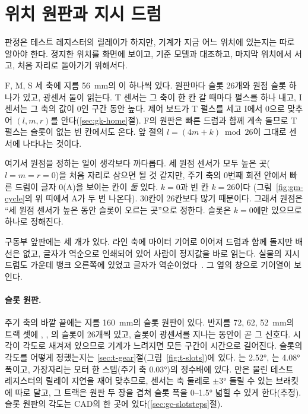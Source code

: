 \section{위치 원판과 지시 드럼}\label{sec:gm-posdisc}

판정은 테스트 레지스터의 릴레이가 하지만, 기계가 지금 어느 위치에 있는지는 따로 알아야 한다. 정지한 위치를 화면에
보이고, 기준 모델과 대조하고, 마지막 위치에서 서고, 처음 자리로 돌아가기 위해서다.

\Ours F, M, S 세 축에 지름 56~mm의 이 하나씩 있다. 원판마다 슬롯 26개와 원점 슬롯
하나가 있고, 광센서 둘이 읽는다. T 센서는 그 축이 한 칸 갈 때마다 펄스를 하나 내고, I 센서는 그 축의 값이 0인 구간
동안 높다. 제어 보드가 T 펄스를 세고 I에서 0으로 맞추어 $(l, m, r)$를 안다(\ref{sec:gk-home}절). F의 원판은 빠른
드럼과 함께 계속 돌므로 T 펄스는 슬롯이 없는 빈 칸에서도 온다. 앞 절의 $l = (4m+k) \bmod 26$이 그대로 센서에 나타나는
것이다.

여기서 원점을 정하는 일이 생각보다 까다롭다. 세 원점 센서가 모두 높은 곳($l = m = r = 0$)을 처음 자리로 삼으면 될 것
같지만, 주기 축의 0번째 회전 안에서 빠른 드럼이 글자 0(A)을 보이는 칸이 \emph{둘} 있다. $k = 0$과 빈 칸 $k = 26$이다
(그림~\ref{fig:gm-cycle}의 위 띠에서 A가 두 번 나온다). 30칸이 26칸보다 많기 때문이다. 그래서 원점은 ``세 원점 센서가
높은 동안  슬롯이 오르는 곳''으로 정한다. 슬롯은 $k = 0$에만 있으므로 하나로 정해진다.

구동부 앞판에는  세 개가 있다. 라인 축에 마이터 기어로 이어져 드럼과 함께 돌지만
배선은 없고, 글자가 역순으로 인쇄되어 있어 사람이 정지값을 바로 읽는다. 실물의 지시 드럼도 가운데 뱅크 오른쪽에
있었고 글자가 역순이었다~\cite{us6812report1944,sale-ringstellung}. 그 옆의 창으로 기어열이 보인다.

\paragraph{슬롯 원판.} 주기 축의 바깥 끝에는 지름 160~mm의 슬롯 원판이 있다. 반지름 72, 62, 52~mm의 트랙 셋에
, , 의 슬롯이 26개씩 있고, 슬롯이 광센서를 지나는 동안이 곧 그 신호다. 시각이
각도로 새겨져 있으므로 기계가 느려지면 모든 구간이 시간으로 길어진다. 슬롯의 각도를 어떻게 정했는지는
\ref{sec:t-gear}절(그림~\ref{fig:t-slots})에 있다. 는 2.52°, 는 4.08° 폭이고, 가장자리는 모터
한 스텝(주기 축 0.03°)의 정수배에 있다. 만은 물린 테스트 레지스터의 릴레이 지연을 재어 맞추므로,
 센서는 축 둘레로 $\pm3°$ 돌릴 수 있는 브래킷에 따로 달고, 그 트랙은 원판 두 장을 겹쳐 슬롯 폭을
0--1.5° 넓힐 수 있게 한다(추정). 슬롯 원판의 각도는 CAD의  한 곳에 있다(\ref{sec:gc-slotsteps}절).

